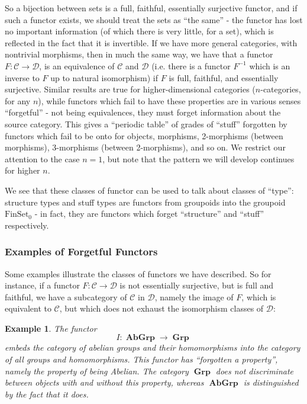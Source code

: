 \documentclass{amsart} \usepackage{amsmath,amssymb,bbm}
\newcommand{\opname}[1]{\operatorname{#1}}
\newcommand{\catname}[1]{\boldsymbol{\opname{{#1}}}}
\newcommand{\FSN}{\catname{FinSet_0}}
\newtheorem{varexample}{Example}
\newenvironment{example}{\begin{varexample}\em}{\em\end{varexample}}
\begin{document}
So a bijection between sets is a full, faithful, essentially surjective
functor, and if such a functor exists, we should treat the sets as ``the
same'' - the functor has lost no important information (of which there is very
little, for a set), which is reflected in the fact that it is invertible.  If
we have more general categories, with nontrivial morphisms, then in much the
same way, we have that a functor $F : \mathcal{C \rightarrow \text{D}}$, is an
equivalence of $\mathcal{C}$ and $\mathcal{D}$ (i.e. there is a functor $F^{-
1}$ which is an inverse to $F$ up to natural isomorphism) if $F$ is full,
faithful, and essentially surjective.  Similar results are true for
higher-dimensional categories ($n$-categories, for any $n$), while functors
which fail to have these properties are in various senses ``forgetful'' - not
being equivalences, they must forget information about the source category. 
This gives a ``periodic table'' of grades of ``stuff'' forgotten by functors
which fail to be onto for objects, morphisms, 2-morphisms (between morphisms),
3-morphisms (between 2-morphisms), and so on.  We restrict our attention to
the case $n = 1$, but note that the pattern we will develop continues for
higher $n$.

We see that these classes of functor can be used to talk about classes
of ``type'': structure types and stuff types are functors from
groupoids into the groupoid $\FSN$ - in fact, they are functors which
forget ``structure'' and ``stuff'' respectively.

\subsubsection{Examples of Forgetful Functors}

Some examples illustrate the classes of functors we have described.  So for
instance, if a functor $F : \mathcal{C} \rightarrow \mathcal{D}$ is not
essentially surjective, but is full and faithful, we have a subcategory of
$\mathcal{C}$ in $\mathcal{D}$, namely the image of $F$, which is equivalent
to $\mathcal{C}$, but which does not exhaust the isomorphism classes of
$\mathcal{D}$:

\begin{example}
  The functor \[ I : \catname{AbGrp} \rightarrow \catname{Grp} \]
  embeds the category of abelian groups and their homomorphisms into
  the category of all groups and homomorphisms.  This functor has
  ``forgotten a property'', namely the property of being Abelian.  The
  category $\catname{Grp}$ does not discriminate between objects with
  and without this property, whereas $\catname{AbGrp}$ is
  distinguished by the fact that it does.
\end{example}
\end{document}
